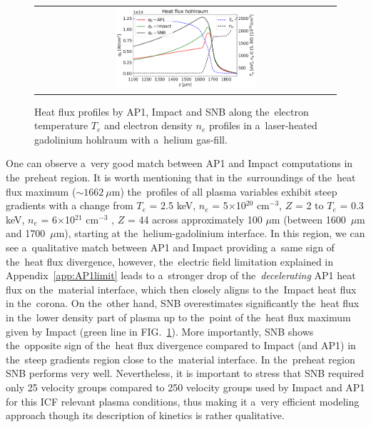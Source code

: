 \documentclass[
 aps,
 jmp,
 amsmath,amssymb,
 twocolumn,
]{revtex4-1}
\newcommand{\figref}[1]{FIG.~\ref{#1}}
\newcommand{\appref}[1]{Appendix~\ref{#1}}
\newcommand{\figscale}{0.48}
\newcommand{\Zbar}{Z}
\newcommand{\Te}{T_e}
\newcommand{\ed}{n_e}
\begin{document}
\begin{figure}[htb]
  \begin{center}
    \begin{tabular}{c}
      \includegraphics[width=\figscale\textwidth]{C7_GdHohlraum_heatflux.png} 
    \end{tabular}
  \caption{
  Heat flux profiles by AP1, Impact and SNB along 
  the~electron temperature $\Te$ and electron density $\ed$
  profiles in a~laser-heated gadolinium hohlraum 
  with a~helium gas-fill.
  }
  \label{fig:Gd_VFP_10ps_heatflux}
  \end{center} 
\end{figure}

One can observe a~very good
match between AP1 and Impact computations in the~preheat region.
It is worth mentioning that in the~surroundings of the~heat flux maximum 
($\sim 1662~\mu$m) the~profiles of all plasma variables 
exhibit steep gradients 
with a change from $T_e$ = 2.5 keV, $n_e$ = 5$\times$10$^{20}$ cm$^{−3}$, 
$\Zbar$ = 2 to $T_e$ = 0.3 keV, $n_e$ = 6$\times$10$^{21}$ cm$^{−3}$ , 
$\Zbar$ = 44 across approximately 100 $\mu$m 
(between 1600~$\mu$m and 1700~$\mu$m), starting at the~helium-gadolinium 
interface.  
In this region, we can see a~qualitative match between AP1 and Impact 
providing a~same sign of the~heat flux divergence, however,
the~electric field limitation explained in 
\appref{app:AP1limit} leads to a~stronger drop of 
the~\textit{decelerating} AP1 heat flux on the~material 
interface, which then closely aligns to the~Impact heat flux in the~corona. 
On the~other hand, 
SNB overestimates significantly the~heat flux in the~lower density part 
of plasma up to the~point of the~heat flux maximum given by Impact 
(green line in \figref{fig:Gd_VFP_10ps_heatflux}). More 
importantly, SNB shows the~opposite sign of the~heat flux divergence compared to Impact
(and AP1) in the~steep gradients region close to the~material interface. 
In the~preheat region SNB performs 
very well. Nevertheless, it is important to stress that 
SNB required only 25 velocity groups compared to 250 velocity groups used by
Impact and AP1 for this ICF relevant plasma conditions, thus making it a~very
efficient modeling approach though its description of kinetics is rather
qualitative.
\end{document}
